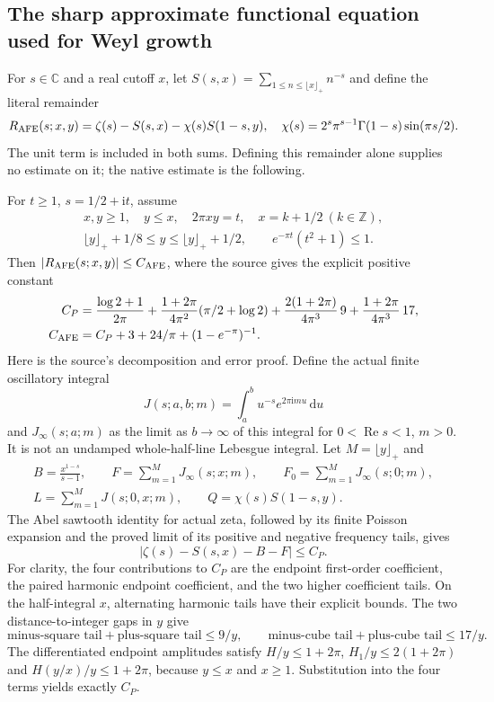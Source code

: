 \documentclass[11pt,a4paper]{article}
\numberwithin{equation}{section}
\theoremstyle{definition}
\newcommand{\C}{\mathbb C}
\newcommand{\Z}{\mathbb Z}
\newcommand{\dd}{\,\mathrm d}
\newcommand{\ii}{\mathrm i}
\newcommand{\Rea}{\operatorname{Re}}
\begin{document}
\subsection{The sharp approximate functional equation used for Weyl growth}
For $s\in\C$ and a real cutoff $x$, let
$S(s,x)=\sum_{1\le n\le\lfloor x\rfloor_+}n^{-s}$ and define the literal
remainder
\[
 R_{\rm AFE}(s;x,y)=\zeta(s)-S(s,x)-\chi(s)S(1-s,y),
 \quad \chi(s)=2^s\pi^{s-1}\Gamma(1-s)\sin(\pi s/2).
\]
The unit term is included in both sums. Defining this remainder alone supplies
no estimate on it; the native estimate is the following.

For $t\ge1$, $s=1/2+\ii t$, assume
\begin{gather*}
 x,y\ge1,\quad y\le x,\quad 2\pi xy=t,\quad x=k+1/2\ (k\in\Z),\\
 \lfloor y\rfloor_++1/8\le y\le\lfloor y\rfloor_++1/2,
 \qquad e^{-\pi t}(t^2+1)\le1.
\end{gather*}
Then $|R_{\rm AFE}(s;x,y)|\le C_{\rm AFE}$, where the source gives the
explicit positive constant
\begin{align*}
 C_P&=\frac{\log2+1}{2\pi}
 +\frac{1+2\pi}{4\pi^2}(\pi/2+\log2)
 +\frac{2(1+2\pi)}{4\pi^3}\,9
 +\frac{1+2\pi}{4\pi^3}\,17,\\
 C_{\rm AFE}&=C_P+3+24/\pi+(1-e^{-\pi})^{-1}.
\end{align*}
Here is the source's decomposition and error proof. Define the actual finite
oscillatory integral
\[
 J(s;a,b;m)=\int_a^b u^{-s}e^{2\pi\ii mu}\dd u
\]
and $J_\infty(s;a;m)$ as the limit as $b\to\infty$ of this integral for
$0<\Rea s<1$, $m>0$. It is not an undamped whole-half-line Lebesgue
integral. Let $M=\lfloor y\rfloor_+$ and
\begin{gather*}
 B=\frac{x^{1-s}}{s-1},\qquad F=\sum_{m=1}^M J_\infty(s;x;m),\qquad
 F_0=\sum_{m=1}^M J_\infty(s;0;m),\\
 L=\sum_{m=1}^M J(s;0,x;m),\qquad Q=\chi(s)S(1-s,y).
\end{gather*}
The Abel sawtooth identity for actual zeta, followed by its finite Poisson
expansion and the proved limit of its positive and negative frequency tails,
gives
\[
 |\zeta(s)-S(s,x)-B-F|\le C_P.
\]
For clarity, the four contributions to $C_P$ are the endpoint first-order
coefficient, the paired harmonic endpoint coefficient, and the two higher
coefficient tails. On the half-integral $x$, alternating harmonic tails have
their explicit bounds. The two distance-to-integer gaps in $y$ give
\[
 \text{minus-square tail}+\text{plus-square tail}\le9/y,
 \qquad
 \text{minus-cube tail}+\text{plus-cube tail}\le17/y.
\]
The differentiated endpoint amplitudes satisfy
$H/y\le1+2\pi$, $H_1/y\le2(1+2\pi)$ and
$H(y/x)/y\le1+2\pi$, because $y\le x$ and $x\ge1$.
Substitution into the four terms yields exactly $C_P$.
\end{document}

